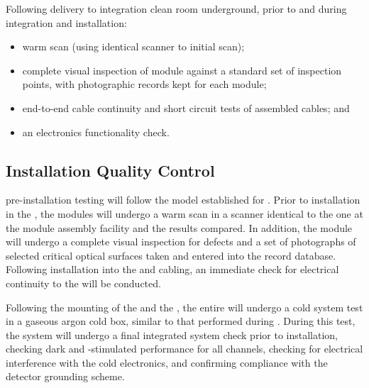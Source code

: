 Following delivery to integration clean room underground, prior to and during integration and installation:
\begin{itemize}
\item warm scan (using identical scanner to initial scan);
\item complete visual inspection of module against a standard set of inspection points, with photographic records kept for each module;
\item end-to-end cable continuity and short circuit tests of assembled cables; and
\item an  electronics functionality check.
\end{itemize}

\subsection{Installation Quality Control}
\label{sec:fdsp-pd-installqc}

 pre-installation testing will follow the model established for .  Prior to installation in the , the  modules will undergo a warm scan in a scanner identical to the one at the  module assembly facility and the results compared.  In addition, the module will undergo a complete visual inspection for defects and a set of photographs of selected critical optical surfaces taken and entered into the  record database.  Following installation into the  and cabling, an immediate check for electrical continuity to the  will be conducted.

Following the mounting of the   and the , the entire  will undergo a cold system test in a gaseous argon cold box, similar to that performed during .  During this test, the  system will undergo a final integrated system check prior to installation, checking dark and -stimulated  performance for all channels, checking for electrical interference with the cold electronics, and confirming compliance with the detector grounding scheme.